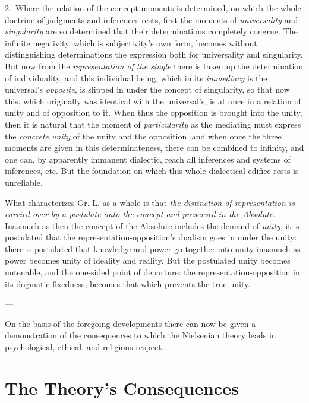 \documentclass[12pt,a4paper]{book}
\begin{document}
2.~Where the relation of the concept-moments is determined, on which the whole doctrine of judgments and
inferences rests, first the moments of \emph{universality} and \emph{singularity} are so determined that their
determinations completely congrue. The infinite negativity, which is subjectivity's own form, becomes without
distinguishing determinations the expression both for universality and singularity. But now from the
\emph{representation of the single} there is taken up the determination of individuality, and this individual
being, which in its \emph{immediacy} is the universal's \emph{opposite}, is slipped in under the concept of singularity, so
that now this, which originally was identical with the universal's, is at once in a relation of unity and of
opposition to it. When thus the opposition is brought into the unity, then it is natural that the moment
of \emph{particularity} as the mediating must express the \emph{concrete unity} of the unity and the opposition, and when
once the three moments are given in this determinateness, there can be combined to infinity, and one can, by
apparently immanent dialectic, reach all inferences and systems of inferences, etc. But the foundation on which
this whole dialectical edifice rests is unreliable.

What characterizes Gr. L. as a whole is that \emph{the distinction of representation is carried over by a
postulate onto the concept and preserved in the Absolute}. Inasmuch as then the concept of the Absolute includes
the demand of \emph{unity}, it is postulated that the representation-opposition's dualism goes in under the unity: there
is postulated that knowledge and power go together into unity inasmuch as power becomes unity of ideality and
reality. But the postulated unity becomes untenable, and the one-sided point of departure: the
representation-opposition in its dogmatic fixedness, becomes that which prevents the true unity.

\begin{center}---\end{center}

On the basis of the foregoing developments there can now be given a demonstration of the consequences to which
the Nielsenian theory leads in psychological, ethical, and religious respect.

\section{The Theory's Consequences}
\label{sec:consequences}
\end{document}
